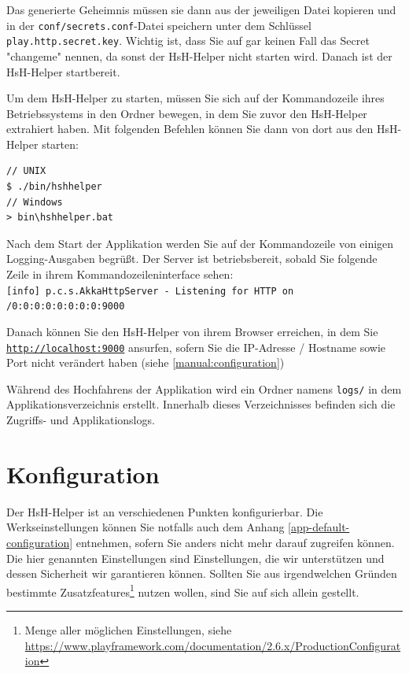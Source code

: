 \documentclass[12pt,DIV14,BCOR10mm,a4paper,parskip=half-,headsepline,headinclude,english,ngerman,bibliography=totocnumbered]{scrreprt}
\begin{document}
Das generierte Geheimnis müssen sie dann aus der jeweiligen Datei kopieren und in der \texttt{conf/secrets.conf}-Datei speichern unter dem Schlüssel \texttt{play.http.secret.key}.
Wichtig ist, dass Sie auf gar keinen Fall das Secret "changeme" nennen, da sonst der HsH-Helper nicht starten wird.
Danach ist der HsH-Helper startbereit.

Um dem HsH-Helper zu starten, müssen Sie sich auf der Kommandozeile ihres Betriebssystems in den Ordner bewegen, in dem Sie zuvor den HsH-Helper extrahiert haben.
Mit folgenden Befehlen können Sie dann von dort aus den HsH-Helper starten:

\begin{lstlisting}[label=server-operation, caption={Kommandozeilenbefehle zum Ausführen der Applikation}, captionpos=b]
// UNIX
$ ./bin/hshhelper
// Windows
> bin\hshhelper.bat
\end{lstlisting}

Nach dem Start der Applikation werden Sie auf der Kommandozeile von einigen Logging-Ausgaben begrüßt.
Der Server ist betriebsbereit, sobald Sie folgende Zeile in ihrem Kommandozeileninterface sehen: \\
\texttt{[info] p.c.s.AkkaHttpServer - Listening for HTTP on /0:0:0:0:0:0:0:0:9000}

Danach können Sie den HsH-Helper von ihrem Browser erreichen, in dem Sie \texttt{\url{http://localhost:9000}} ansurfen, sofern Sie die IP-Adresse / Hostname sowie Port nicht verändert haben (siehe \autoref{manual:configuration})

Während des Hochfahrens der Applikation wird ein Ordner namens \texttt{logs/} in dem Applikationsverzeichnis erstellt.
Innerhalb dieses Verzeichnisses befinden sich die Zugriffs- und Applikationslogs.

\chapter{Konfiguration}
\label{manual:configuration}

Der HsH-Helper ist an verschiedenen Punkten konfigurierbar.
Die Werkseinstellungen können Sie notfalls auch dem Anhang \ref{app-default-configuration} entnehmen, sofern Sie anders nicht mehr darauf zugreifen können.
Die hier genannten Einstellungen sind Einstellungen, die wir unterstützen und dessen Sicherheit wir garantieren können.
Sollten Sie aus irgendwelchen Gründen bestimmte Zusatzfeatures\footnote{Menge aller möglichen Einstellungen, siehe \url{https://www.playframework.com/documentation/2.6.x/ProductionConfiguration}} nutzen wollen, sind Sie auf sich allein gestellt.
\end{document}

